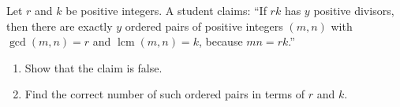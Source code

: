 Let $r$ and $k$ be positive integers. A student claims: ``If $rk$ has $y$ positive divisors, then there are exactly $y$ ordered pairs of positive integers $(m,n)$ with $\gcd(m,n)=r$ and $\operatorname{lcm}(m,n)=k$, because $mn=rk$.''
\begin{enumerate}
\item[(a)] Show that the claim is false.
\item[(b)] Find the correct number of such ordered pairs in terms of $r$ and $k$.
\end{enumerate}
